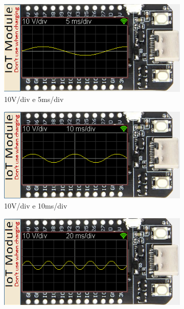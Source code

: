\begin{figure}[H]
    \centering
    \begin{subfigure}{0.35\textwidth}
        \centering
        \includegraphics[width=1\linewidth]{Imagens/Testes no simulador/Horizontal 5ms.png}
        \captionsetup{justification=centering}
        \caption{10V/div e 5ms/div}
        \label{fig:10V/div e 5ms/div simulador}
    \end{subfigure}
    \begin{subfigure}{0.35\textwidth}
        \centering
        \includegraphics[width=1\linewidth]{Imagens/Testes no simulador/Horizontal 10ms.png}
        \captionsetup{justification=centering}
        \caption{10V/div e 10ms/div}
        \label{fig:10V/div e 10ms/div simulador}
    \end{subfigure}
    \begin{subfigure}{0.35\textwidth}
        \centering
        \includegraphics[width=1\linewidth]{Imagens/Testes no simulador/Horizontal 20ms.png}

\end{subfigure}
\end{figure}
